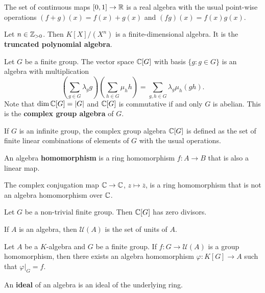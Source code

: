 \begin{example}
	The set of continuous maps $[0,1]\to\mathbb{R}$ is a real algebra with the usual
	point-wise operations $(f+g)(x)=f(x)+g(x)$ and $(fg)(x)=f(x)g(x)$. 
\end{example}

\begin{example}
	Let $n\in\mathbb{Z}_{>0}$. Then $K[X]/(X^n)$ is a finite-dimensional algebra. 
    It is the \textbf{truncated polynomial algebra}.  
\end{example}

\begin{example}
	Let $G$ be a finite group. The vector space 
	$\mathbb{C}[G]$ with basis $\{g:g\in G\}$
	is an algebra with multiplication
	\[
	\left(\sum_{g\in G}\lambda_gg\right)\left(\sum_{h\in G}\mu_hh\right)
	=\sum_{g,h\in G}\lambda_g\mu_h(gh).
	\] 	
	Note that $\dim\mathbb{C}[G]=|G|$ and
	$\mathbb{C}[G]$ is commutative if and only $G$ is abelian. 
	This is the \textbf{complex group algebra} of $G$. 
\end{example}

If $G$ is an infinite group, the complex group algebra $\mathbb{C}[G]$ 
is defined as the set 
of finite linear combinations of elements of $G$ 
with the usual operations. 

\begin{definition}
    An algebra \textbf{homomorphism} is a ring homomorphism $f\colon A\to B$ that is also a linear map. 
\end{definition}

The complex conjugation map  
$\mathbb{C}\to \mathbb{C}$, $z\mapsto\overline{z}$, is a ring homomorphism that is not an algebra homomorphism over $\mathbb{C}$. 

 
\begin{exercise}
	Let $G$ be a non-trivial finite group. 
	Then $\mathbb{C}[G]$ has zero divisors. 
\end{exercise}

If $A$ is an algebra, then $\mathcal{U}(A)$ is the set 
of units of $A$. 

\begin{exercise}
	Let $A$ be a $K$-algebra and $G$ be a finite group. 
	If $f\colon G\to\mathcal{U}(A)$ is a group homomorphism, 
	then there exists an algebra homomorphism 
	$\varphi\colon K[G]\to A$ such that $\varphi|_G=f$.   	
\end{exercise}

\begin{definition}
 	An \textbf{ideal} of an algebra is an ideal of the underlying ring.
\end{definition}

